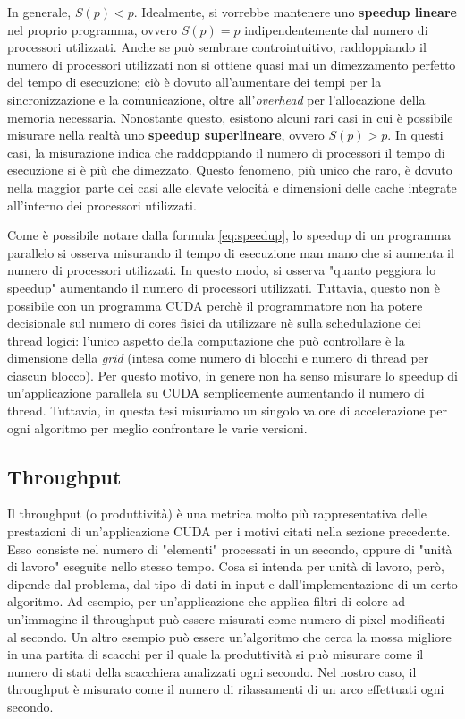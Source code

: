 \documentclass[a4paper]{article}
\begin{document}
	In generale, $S(p) < p$. Idealmente, si vorrebbe mantenere uno \textbf{speedup lineare} nel proprio programma, ovvero $S(p) = p$ indipendentemente dal numero di processori utilizzati. Anche se può sembrare controintuitivo, raddoppiando il numero di processori utilizzati non si ottiene quasi mai un dimezzamento perfetto del tempo di esecuzione; ciò è dovuto all'aumentare dei tempi per la sincronizzazione e la comunicazione, oltre all'\textit{overhead} per l'allocazione della memoria necessaria. Nonostante questo, esistono alcuni rari casi in cui è possibile misurare nella realtà uno \textbf{speedup superlineare}, ovvero $S(p) > p$. In questi casi, la misurazione indica che raddoppiando il numero di processori il tempo di esecuzione si è più che dimezzato. Questo fenomeno, più unico che raro, è dovuto nella maggior parte dei casi alle elevate velocità e dimensioni delle cache integrate all'interno dei processori utilizzati.
	
	Come è possibile notare dalla formula \ref{eq:speedup}, lo speedup di un programma parallelo si osserva misurando il tempo di esecuzione man mano che si aumenta il numero di processori utilizzati. In questo modo, si osserva "quanto peggiora lo speedup" aumentando il numero di processori utilizzati. Tuttavia, questo non è possibile con un programma CUDA perchè il programmatore non ha potere decisionale sul numero di cores fisici da utilizzare nè sulla schedulazione dei thread logici: l'unico aspetto della computazione che può controllare è la dimensione della \textit{grid} (intesa come numero di blocchi e numero di thread per ciascun blocco). Per questo motivo, in genere non ha senso misurare lo speedup di un'applicazione parallela su CUDA semplicemente aumentando il numero di thread. Tuttavia, in questa tesi misuriamo un singolo valore di accelerazione per ogni algoritmo per meglio confrontare le varie versioni.
	
	\subsection{Throughput}
	Il throughput (o produttività) è una metrica molto più rappresentativa delle prestazioni di un'applicazione CUDA per i motivi citati nella sezione precedente. Esso consiste nel numero di "elementi" processati in un secondo, oppure di "unità di lavoro" eseguite nello stesso tempo. Cosa si intenda per unità di lavoro, però, dipende dal problema, dal tipo di dati in input e dall'implementazione di un certo algoritmo. Ad esempio, per un'applicazione che applica filtri di colore ad un'immagine il throughput può essere misurati come numero di pixel modificati al secondo. Un altro esempio può essere un'algoritmo che cerca la mossa migliore in una partita di scacchi per il quale la produttività si può misurare come il numero di stati della scacchiera analizzati ogni secondo. Nel nostro caso, il throughput è misurato come il numero di rilassamenti di un arco effettuati ogni secondo.
	
\end{document}
